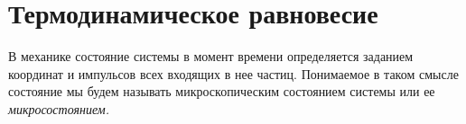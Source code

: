 \section{Термодинамическое равновесие}

В механике состояние системы в момент времени определяется заданием координат и импульсов всех входящих в нее частиц. Понимаемое в таком смысле состояние мы будем называть микроскопическим состоянием системы или ее \it{микросостоянием}.